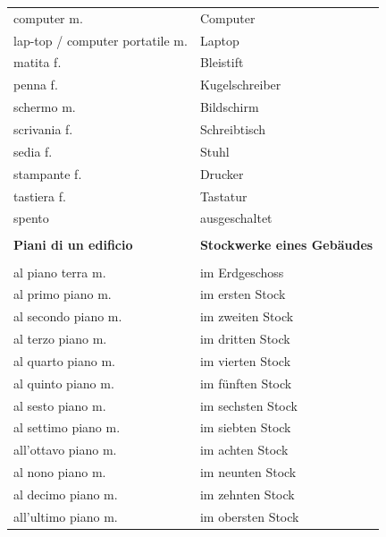\documentclass[10pt]{scrartcl}
\begin{document}
\begin{multicols*}{2}
\begin{supertabular}{p{4cm}p{4cm}}
computer \hfill m. & Computer\\
lap-top / computer portatile \hfill m. & Laptop\\
matita \hfill f. & Bleistift\\
penna \hfill f. & Kugelschreiber\\
schermo \hfill m. & Bildschirm \\
scrivania \hfill f. & Schreibtisch\\
sedia \hfill f. & Stuhl\\
stampante \hfill f. & Drucker\\
tastiera \hfill f. & Tastatur\\
spento & ausgeschaltet\\
\\
\textbf{Piani di un edificio} & \textbf{Stockwerke eines Gebäudes}\\
\\
al piano terra \hfill m. & im Erdgeschoss\\
al primo piano \hfill m. & im ersten Stock\\
al secondo piano \hfill m. & im zweiten Stock\\
al terzo piano \hfill m. & im dritten Stock\\
al quarto piano \hfill m. & im vierten Stock\\
al quinto piano \hfill m. & im fünften Stock\\
al sesto piano \hfill m. & im sechsten Stock\\
al settimo piano \hfill m. & im siebten Stock\\
all'ottavo piano \hfill m. & im achten Stock\\
al nono piano \hfill m. & im neunten Stock\\
al decimo piano \hfill m. & im zehnten Stock\\
all'ultimo piano \hfill m. & im obersten Stock\\
\end{supertabular} 

\end{multicols*}
\end{document}
